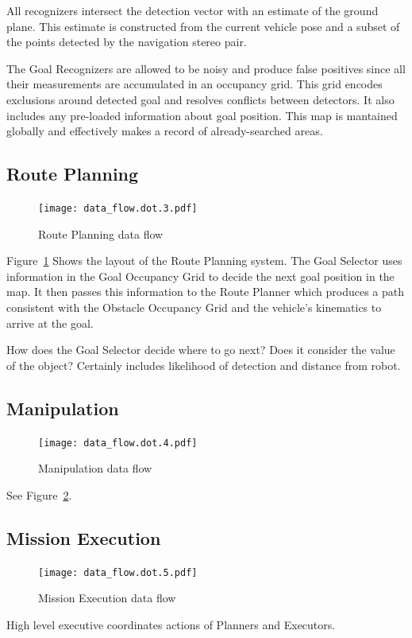 \documentclass[12pt]{article}
\begin{document}
All recognizers intersect the detection vector with an estimate of the ground plane. This estimate is constructed from the current vehicle pose and a subset of the points detected by the navigation stereo pair.

The Goal Recognizers are allowed to be noisy and produce false positives since all their measurements are accumulated in an occupancy grid. This grid encodes exclusions around detected goal and resolves conflicts between detectors. It also includes any pre-loaded information about goal position. This map is mantained globally and effectively makes a record of already-searched areas.

\subsection{Route Planning}
\begin{figure}
\centering
\texttt{[image: data\_flow.dot.3.pdf]}
\caption{Route Planning data flow}
\label{fig_df_rp}
\end{figure}
Figure~\ref{fig_df_rp} Shows the layout of the Route Planning system. The Goal Selector uses information in the Goal Occupancy Grid to decide the next goal position in the map. It then passes this information to the Route Planner which produces a path consistent with the Obstacle Occupancy Grid and the vehicle's kinematics to arrive at the goal.

How does the Goal Selector decide where to go next? Does it consider the value of the object? Certainly includes likelihood of detection and distance from robot.

\subsection{Manipulation}\label{Manipulation}
\begin{figure}
\centering
\texttt{[image: data\_flow.dot.4.pdf]}
\caption{Manipulation data flow}
\label{fig_df_man}
\end{figure}
See Figure~\ref{fig_df_man}.

\subsection{Mission Execution}\label{MissionExecution}
\begin{figure}
\centering
\texttt{[image: data\_flow.dot.5.pdf]}
\caption{Mission Execution data flow}
\label{fig_df_exec}
\end{figure}

High level executive coordinates actions of Planners and Executors.



\end{document}
